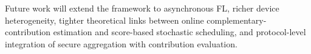 \documentclass[journal]{IEEEtran}
\begin{document}
Future work will extend the framework to asynchronous FL, richer device heterogeneity, tighter theoretical links between online complementary-contribution estimation and score-based stochastic scheduling, and protocol-level integration of secure aggregation with contribution evaluation.



\end{document}
